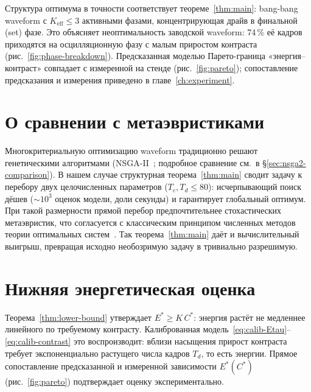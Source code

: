 Структура оптимума в точности соответствует теореме~\ref{thm:main}: bang-bang
waveform с $K_{\mathrm{eff}}\le 3$ активными фазами, концентрирующая драйв в
финальной (set) фазе. Это объясняет неоптимальность заводской waveform:
74\,\% её кадров приходятся на осцилляционную фазу с малым приростом контраста
(рис.~\ref{fig:phase-breakdown}). Предсказанная моделью Парето-граница
«энергия--контраст» совпадает с измеренной на стенде
(рис.~\ref{fig:pareto}); сопоставление предсказания и измерения приведено в
главе~\ref{ch:experiment}.

\section{О сравнении с метаэвристиками}\label{sec:metaheuristics}

Многокритериальную оптимизацию waveform традиционно решают генетическими
алгоритмами (NSGA-II~\cite{deb2002_nsga2}; подробное сравнение см.~в \S\ref{sec:nsga2-comparison}). В нашем случае структурная теорема~\ref{thm:main} сводит
задачу к перебору двух целочисленных параметров ($T_c,T_d\le 80$): исчерпывающий
поиск дёшев ($\sim\!10^3$ оценок модели, доли секунды) и гарантирует
глобальный оптимум. При такой размерности прямой перебор предпочтительнее
стохастических метаэвристик, что согласуется с классическим принципом численных
методов теории оптимальных систем~\cite{moiseev1971_numerical}. Так
теорема~\ref{thm:main} даёт и вычислительный выигрыш, превращая исходно
необозримую задачу в тривиально разрешимую.

\section{Нижняя энергетическая оценка}\label{sec:lower-bound-check}

Теорема~\ref{thm:lower-bound} утверждает $E^{*}\ge K\,C^{*}$: энергия растёт не
медленнее линейного по требуемому контрасту. Калиброванная
модель~\eqref{eq:calib-Etau}--\eqref{eq:calib-contrast} это воспроизводит: вблизи
насыщения прирост контраста требует экспоненциально растущего числа кадров
$T_d$, то есть энергии. Прямое сопоставление предсказанной и измеренной
зависимости $E^{*}(C^{*})$ (рис.~\ref{fig:pareto}) подтверждает оценку
экспериментально.

